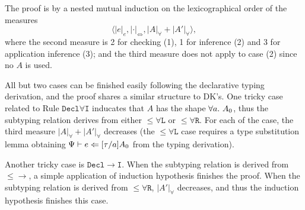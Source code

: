 The proof is by a nested mutual induction on the lexicographical order of the measures
$$\langle |e|_e, |\cdot|_\Leftrightarrow, |A|_\forall + |A'|_\forall \rangle,$$
where the second measure is 2 for checking (1), 1 for inference (2) and 3 for application inference (3);
and the third measure does not apply to case (2) since no $A$ is used.

All but two cases can be finished easily following the declarative typing derivation,
and the proof shares a similar structure to DK's.
One tricky case related to Rule $\mathtt{Decl\forall I}$ inducates that $A$ has the shape $\all A_0$,
thus the subtyping relation derives from either $\mathtt{{\le}\forall L}$ or $\mathtt{{\le}\forall R}$.
For each of the case, the third measure $|A|_\forall + |A'|_\forall$ decreases
(the $\mathtt{{\le}\forall L}$ case requires a type substitution lemma obtaining
$\Psi \vdash e \Leftarrow [\tau/a]A_0$ from the typing derivation).

Another tricky case is $\mathtt{Decl{\to}I}$.
When the subtyping relation is derived from $\mathtt{{\le}{\to}}$,
a simple application of induction hypothesis finishes the proof.
When the subtyping relation is derived from $\mathtt{{\le}\forall R}$,
$|A'|_\forall$ decreases, and thus the induction hypothesis finishes this case.
